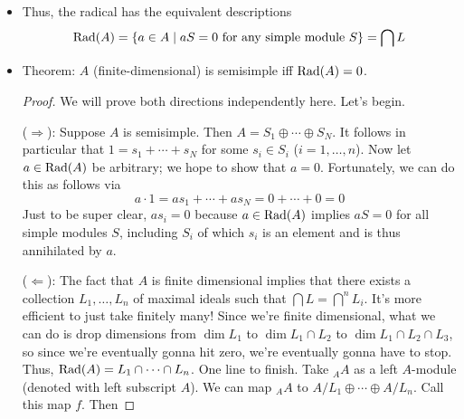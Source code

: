 \documentclass[../notes.tex]{subfiles}
\begin{document}
\begin{itemize}
\begin{proof}
        If $S$ is an arbitrary simple module containing $v_0\neq 0$, then we may define $f:A\to S$ sending $a\mapsto av_0$. Note that $0\subsetneq\im(f)\subseteq S$. But $f$ is surjective, so $\im(F)=S$. It follows that $S\cong A/L$??\par\smallskip
        If $x\in\Rad(A)$, where $L$ is a maximal left ideal of $A$, then $x(A/L)=0$. It follows that $xA\subseteq L$. But since $x\in xA$, this means that $x\in L$. It follows that $\Rad(A)\subset\bigcap L$.\par
        Now, to show the other inclusion, let $x\in\bigcap L$. Let $S$ be an arbitrary simple module over $A$. We know that $S\cong A/L$ for some maximal ideal $L$. But $xA\subset L$. Essentially, we have a map $A\twoheadrightarrow S$ sending $a\mapsto av_0$ ($v_0\neq 0$) with kernel $L$ containing $x$, so then $xv_0=0$. How does this whole reverse inclusion chunk work??
    \end{proof}
    \item Thus, the radical has the equivalent descriptions
    \begin{equation*}
        \operatorname{Rad}(A) = \{a\in A\mid aS=0\text{ for any simple module }S\}
        = \bigcap L
    \end{equation*}
    \item Theorem: $A$ (finite-dimensional) is semisimple iff $\operatorname{Rad}(A)=0$.
    \begin{proof}
        We will prove both directions independently here. Let's begin.\par
        ($\Rightarrow$): Suppose $A$ is semisimple. Then $A=S_1\oplus\cdots\oplus S_N$. It follows in particular that $1=s_1+\cdots+s_N$ for some $s_i\in S_i$ ($i=1,\dots,n$). Now let $a\in\operatorname{Rad}(A)$ be arbitrary; we hope to show that $a=0$. Fortunately, we can do this as follows via
        \begin{equation*}
            a\cdot 1 = as_1+\cdots+as_N
            = 0+\cdots+0
            = 0
        \end{equation*}
        Just to be super clear, $as_i=0$ because $a\in\operatorname{Rad}(A)$ implies $aS=0$ for all simple modules $S$, including $S_i$ of which $s_i$ is an element and is thus annihilated by $a$.\par
        ($\Leftarrow$): The fact that $A$ is finite dimensional implies that there exists a collection $L_1,\dots,L_n$ of maximal ideals such that $\bigcap L=\bigcap^nL_i$. It's more efficient to just take finitely many! Since we're finite dimensional, what we can do is drop dimensions from $\dim L_1$ to $\dim L_1\cap L_2$ to $\dim L_1\cap L_2\cap L_3$, so since we're eventually gonna hit zero, we're eventually gonna have to stop. Thus, $\operatorname{Rad}(A)=L_1\cap\cdots\cap L_n$. One line to finish. Take ${}_AA$ as a left $A$-module (denoted with left subscript $A$). We can map ${}_AA$ to $A/L_1\oplus\cdots\oplus A/L_n$. Call this map $f$. Then

\end{proof}
\end{itemize}
\end{document}

